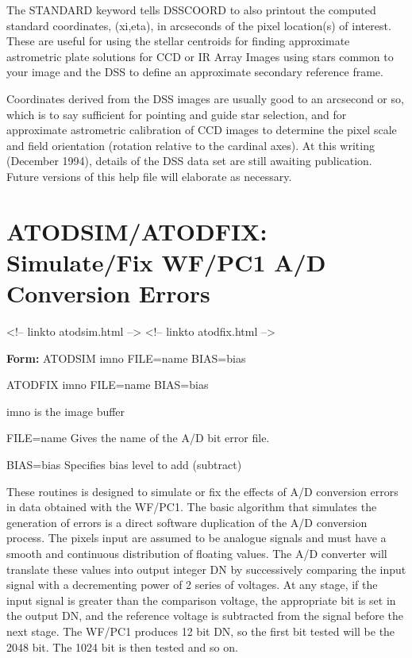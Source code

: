 The STANDARD keyword tells DSSCOORD to also printout the computed standard
coordinates, (xi,eta), in arcseconds of the pixel location(s) of interest.
These are useful for using the stellar centroids for finding approximate
astrometric plate solutions for CCD or IR Array Images using stars common
to your image and the DSS to define an approximate secondary reference
frame.

Coordinates derived from the DSS images are usually good to an arcsecond or
so, which is to say sufficient for pointing and guide star selection, and
for approximate astrometric calibration of CCD images to determine the
pixel scale and field orientation (rotation relative to the cardinal axes).
At this writing (December 1994), details of the DSS data set are still
awaiting publication.  Future versions of this help file will elaborate as
necessary.

\section{ATODSIM/ATODFIX: Simulate/Fix WF/PC1 A/D Conversion Errors}
\begin{rawhtml}
<!-- linkto atodsim.html --> <!-- linkto atodfix.html -->
\end{rawhtml}
 
\begin{command}
  \item[\textbf{Form: }ATODSIM imno FILE=name BIAS=bias\hfill]{}
  \item[ATODFIX imno FILE=name BIAS=bias\hfill]{}
  \item[imno]{is the image buffer}
  \item[FILE=name]{Gives the name of the A/D bit error file.}
  \item[BIAS=bias]{Specifies bias level to add (subtract)}
\end{command}
 
These routines is designed to simulate or fix the effects of A/D conversion
errors in data obtained with the WF/PC1.  The basic algorithm that
simulates the generation of errors is a direct software duplication of the
A/D conversion process.  The pixels input are assumed to be analogue
signals and must have a smooth and continuous distribution of floating
values.  The A/D converter will translate these values into output integer
DN by successively comparing the input signal with a decrementing power of 2
series of voltages.  At any stage, if the input signal is greater than the
comparison voltage, the appropriate bit is set in the output DN, and the
reference voltage is subtracted from the signal before the next stage.  The
WF/PC1 produces 12 bit DN, so the first bit tested will be the 2048 bit.  The
1024 bit is then tested and so on.

